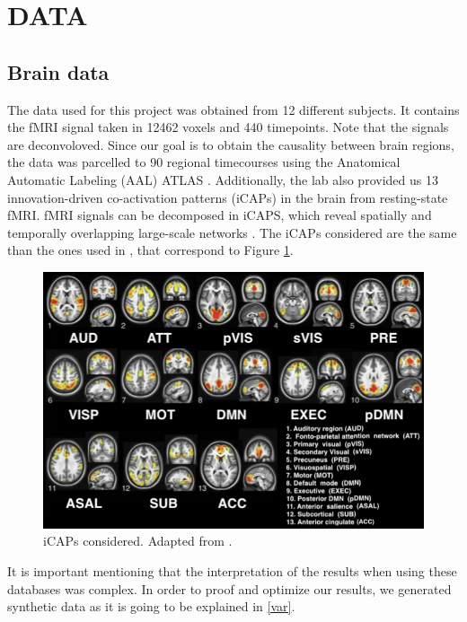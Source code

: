 \documentclass[10pt,conference,compsocconf]{IEEEtran}
\begin{document}
\section{DATA}
\label{sec:data}

\subsection{Brain data}\label{subsec:braindata}

The data used for this project was obtained from 12 different
subjects. It contains the fMRI signal taken in 12462 voxels and 440 timepoints. Note that the signals are deconvoloved. Since our goal is to obtain the causality between brain regions, the data was parcelled to 90 regional timecourses using the Anatomical Automatic Labeling (AAL) ATLAS \cite{TZOURIOMAZOYER2002273}. Additionally, the lab also provided us 13 innovation-driven co-activation patterns (iCAPs) in the brain from resting-state fMRI. fMRI signals can be decomposed in iCAPS, which reveal spatially and temporally overlapping large-scale networks \cite{icap}. The iCAPs considered are the same than the ones used in \cite{bolton2018interactions}, that correspond to Figure \ref{fig:icapsPaper}.
\begin{figure}
    \centering
    \includegraphics[width=\columnwidth]{images/icaps.jpeg}
    \vspace{-3mm}
    \caption{iCAPs considered. Adapted from \cite{icap}.}
    \label{fig:icapsPaper}
    \vspace{-5mm}
\end{figure}


It is important mentioning that the interpretation of the results when using these databases was complex. In order to proof and optimize our results, we generated synthetic data as it is going to be explained in \ref{var}.
\end{document}
